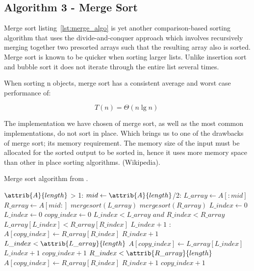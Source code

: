\documentclass[sigconf, nonacm, natbib, screen, balance=False]{acmart}
\begin{document}
\subsection{Algorithm 3 - Merge Sort}\label{sec:algo3}

Merge sort listing~\ref{lst:merge_algo} is yet another comparison-based sorting algorithm that uses the divide-and-conquer approach which involves recursively merging together two presorted arrays such that the resulting array also is sorted. Merge sort is known to be quicker when sorting larger lists. Unlike insertion sort and bubble sort it does not iterate through the entire list several times. 

When sorting n objects, merge sort has a consistent average and worst case performance of: 

\begin{equation}
  T(n) = \Theta(n\lg n) \;  \label{eq:merge_sort_best}
\end{equation}

The implementation we have chosen of merge sort, as well as the most common implementations, do not sort in place. Which brings us to one of the drawbacks of merge sort; its memory requirement. The memory size of the input must be allocated for the sorted output to be sorted in, hence it uses more memory space than other in place sorting algorithms. (Wikipedia). 

\begin{listing}
  \caption{Merge sort algorithm from \citet[Ch.~2.1]{CLRS_2009}.}
  \label{lst:merge_algo}

  \begin{codebox}
    \li \If $\attrib{A}{length}$ > 1: 
    \li \Do
    $mid \gets \attrib{A}{length}$/2: 
    \li $L\_array\gets A[:mid]$
    \li $R\_array\gets A[mid:]$
    \li $mergesort(L\_array)$
    \li $mergesort(R\_array)$
    \li $L\_index\gets 0$
    \li $L\_index\gets 0$
    \li $copy\_index\gets 0$
    \li \While $L\_index < L\_array$ $and$ $R\_index < R\_array$ 
    \li \Do
    \If $L\_array[L\_index] < R\_array[R\_index]$
    \li \Do
    $L\_index + 1$
    \li \Else:
    \li $A[copy\_index] \gets R\_array[R\_index]$
    \li $R\_index + 1$
    \End
    \End
    \li \While $L\_index < \attrib{L\_array}{length}$
    \li \Do
    $A[copy\_index] \gets L\_array[L\_index]$
    \li $L\_index + 1$
    \li $copy\_index + 1$
    \End
    \li \While $R\_index < \attrib{R\_array}{length}$
    \li \Do
    $A[copy\_index] \gets R\_array[R\_index]$
    \li $R\_index + 1$
    \li $copy\_index + 1$    
  \end{codebox}
\end{listing}
\end{document}
